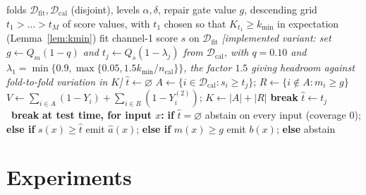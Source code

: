 \documentclass{article}
\theoremstyle{plain}
\theoremstyle{definition}
\theoremstyle{remark}
\begin{document}
\begin{algorithm}[t]
\caption{CCRC (calibration and deployment). Thresholds are score \emph{values}, fixed before
calibration, which is what Theorem~\ref{thm:validity} covers; the bracketed lines are the
rank-indexed substitution our implementation makes (Remark~\ref{rem:rankvsvalue}).}
\label{alg:ccrc}
\begin{algorithmic}[1]
\Require folds $\mathcal{D}_{\mathrm{fit}},\mathcal{D}_{\mathrm{cal}}$ (disjoint), levels
$\alpha,\delta$, repair gate value $g$, descending grid $t_1>\dots>t_M$ of score values, with
$t_1$ chosen so that $K_{t_1}\ge k_{\min}$ in expectation (Lemma~\ref{lem:kmin})
\State fit channel-1 score $s$ on $\mathcal{D}_{\mathrm{fit}}$ 
\Statex \emph{[implemented variant: set $g\gets Q_m(1-q)$ and $t_j\gets Q_s(1-\lambda_j)$ from
$\mathcal{D}_{\mathrm{cal}}$, with $q=0.10$ and
$\lambda_1=\min\{0.9,\max\{0.05,1.5k_{\min}/n_{\mathrm{cal}}\}\}$, the factor $1.5$ giving
headroom against fold-to-fold variation in $K$]}
\State $\hat t\gets\varnothing$
  \State $A\gets\{i\in\mathcal{D}_{\mathrm{cal}}:s_i\ge t_j\}$;
         $R\gets\{i\notin A:m_i\ge g\}$
  \State $V\gets\sum_{i\in A}(1-Y_i)+\sum_{i\in R}(1-Y^{(2)}_i)$; $K\gets|A|+|R|$
   \textbf{break} 
   $\hat t\gets t_j$
  \Else\ \textbf{break} 
  \EndIf
\EndFor
\State \textbf{at test time, for input $x$:} \textbf{if} $\hat t=\varnothing$ abstain on
  every input (coverage $0$);
  \textbf{else if} $s(x)\ge\hat t$ emit $\hat a(x)$;
  \textbf{else if} $m(x)\ge g$ emit $b(x)$;
  \textbf{else} abstain
  \Statex {}
\end{algorithmic}
\end{algorithm}

\section{Experiments}
\label{sec:exp}
\end{document}
